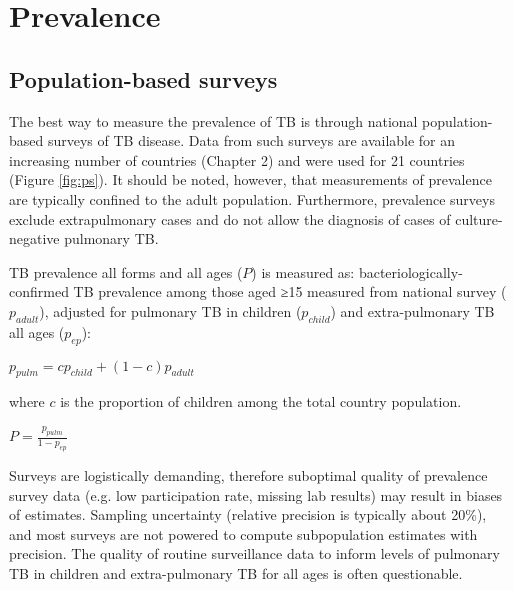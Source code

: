 \section{Prevalence}

\subsection{Population-based surveys}
The best way to measure the prevalence of TB is through national population-based surveys of TB disease\cite{18713496}\cite{WHO2011}. Data from such surveys are available for an increasing number of countries (Chapter 2) and were used for 21 countries (Figure \ref{fig:ps}). It should be noted, however, that measurements of prevalence are typically confined to the adult population. Furthermore, prevalence surveys exclude extrapulmonary cases and do not allow the diagnosis of cases of culture-negative pulmonary TB. 

TB prevalence all forms and all ages ($P$) is measured as: bacteriologically-confirmed TB prevalence among those aged ≥15 measured from national survey ($p_{adult}$), adjusted for pulmonary TB in children ($p_{child}$) and extra-pulmonary TB all ages ($p_{ep}$):

$p_{pulm} = c p_{child} + (1 − c) p_{adult}$

where $c$ is the proportion of children among the total country population.

$P = \frac{p_{pulm}}{1 - p_{ep}}$

Surveys are logistically demanding, therefore suboptimal quality of prevalence survey data (e.g. low participation rate, missing lab results) may result in biases of estimates. Sampling uncertainty (relative precision is typically about 20\%), and most surveys are not powered to compute subpopulation estimates with precision. The  quality of routine surveillance data to inform levels of pulmonary TB in children and extra-pulmonary TB for all ages is often questionable.



 